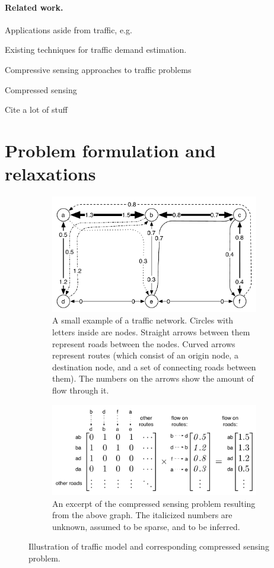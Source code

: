 \documentclass{article} %
\begin{document}
\paragraph{Related work.}
Applications aside from traffic, e.g.

Existing techniques for traffic demand estimation.

Compressive sensing approaches to traffic problems

Compressed sensing

Cite a lot of stuff

\section{Problem formulation and relaxations}
\begin{figure}[t]
  \centering
  \begin{subfigure}[h]{0.8\textwidth}
    \label{road-network-graph}
    \includegraphics[width=\textwidth]{figures/road-network-graph.pdf}
    \caption{A small example of a traffic network. Circles with letters inside
      are nodes. Straight arrows between them represent roads between the
      nodes. Curved arrows represent routes (which consist of an origin node, a
      destination node, and a set of connecting roads between them). The numbers
      on the arrows show the amount of flow through it.}
  \end{subfigure}
  \begin{subfigure}[h]{0.8\textwidth}
    \label{road-network-matrix}
    \includegraphics[width=\textwidth]{figures/road-network-matrix.pdf}
    \caption{An excerpt of the compressed sensing problem resulting from the
      above graph. The italicized numbers are unknown, assumed to be sparse,
      and to be inferred.}
  \end{subfigure}
  \caption{Illustration of traffic model and corresponding compressed sensing problem.}
  \label{traffic-model-illustration}
\end{figure}
\end{document}
